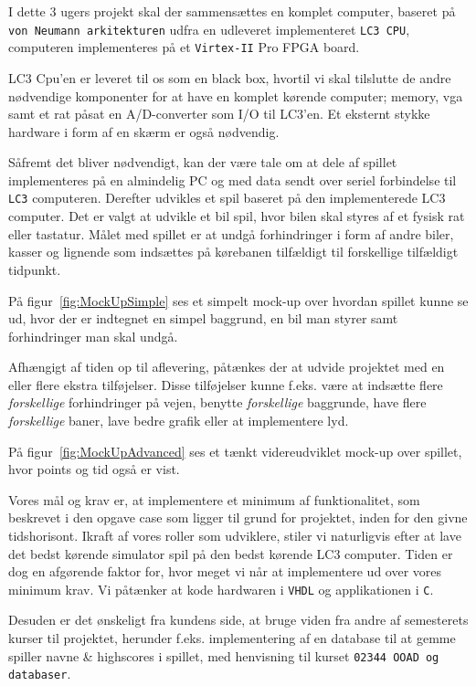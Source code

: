 I dette 3 ugers projekt skal der sammensættes en komplet computer, baseret på \texttt{von Neumann arkitekturen} udfra en udleveret implementeret \texttt{LC3 CPU}, computeren implementeres på et \texttt{Virtex-II} Pro FPGA board.

LC3 Cpu’en er leveret til os som en black box, hvortil vi skal tilslutte de andre nødvendige komponenter for at have en komplet kørende computer; memory, vga samt et rat påsat en A/D-converter som I/O til LC3’en. Et eksternt stykke hardware i form af en skærm er også nødvendig.

Såfremt det bliver nødvendigt, kan der være tale om at dele af spillet implementeres på en almindelig PC og med data sendt over seriel forbindelse til \texttt{LC3} computeren. 
Derefter udvikles et spil baseret på den implementerede LC3 computer. Det er valgt at udvikle et bil spil, hvor bilen skal styres af et fysisk rat eller tastatur. Målet med spillet er at undgå forhindringer i form af andre biler, kasser og lignende som indsættes på kørebanen tilfældigt til forskellige tilfældigt tidpunkt.

På figur~\vref{fig:MockUpSimple} ses et simpelt mock-up over hvordan spillet kunne se ud, hvor der er indtegnet en simpel baggrund, en bil man styrer samt forhindringer man skal undgå.


Afhængigt af tiden op til aflevering, påtænkes der at udvide projektet med en eller flere ekstra tilføjelser. Disse tilføjelser kunne f.eks. være at indsætte flere \textit{forskellige} forhindringer på vejen, benytte \textit{forskellige} baggrunde, have flere \textit{forskellige} baner, lave bedre grafik eller at implementere lyd.

På figur~\vref{fig:MockUpAdvanced} ses et tænkt videreudviklet mock-up over spillet, hvor points og tid også er vist.


Vores mål og krav er, at implementere et minimum af funktionalitet, som beskrevet i den opgave case som ligger til grund for projektet, inden for den givne tidshorisont. Ikraft af vores roller som udviklere, stiler vi naturligvis efter at lave det bedst kørende simulator spil på den bedst kørende LC3 computer. Tiden er dog en afgørende faktor for, hvor meget vi når at implementere ud over vores minimum krav.
Vi påtænker at kode hardwaren i \texttt{VHDL} og applikationen i \texttt{C}.

Desuden er det ønskeligt fra kundens side, at bruge viden fra andre af semesterets kurser til projektet, herunder f.eks. implementering af en database til at gemme spiller navne & highscores i spillet, med henvisning til kurset \texttt{02344 OOAD og databaser}.

